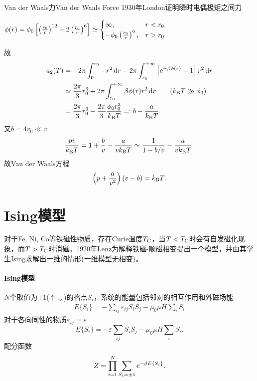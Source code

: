 \begin{example}{Van der Waals力}{Van der Waals Force}
	1930年London证明瞬时电偶极矩之间力
	\begin{center}
		\(\phi(r)=\phi_0\left[\left(\frac{r_0}r\right)^{12}-2\left(\frac{r_0}r\right)^6\right]\simeq\begin{cases}
			\infty,&r<r_0\\
			-\phi_0\left(\frac{r_0}r\right)^6,&r>r_0
		\end{cases}\)

	\end{center}
	故
	{\begin{align*}
		a_2(T)&=-2\pi\int_0^{r_0}-r^2\d r-2\pi\int_{r_0}^{+\infty}\fkh{\e{-\beta\phi(r)}-1}r^2\d r\\
		&\simeq\frac{2\pi}3r_0^3+2\pi\int_{r_0}^{+\infty}\beta\phi(r)r^2\d r\tag{$\kB T\gg\phi_0$}\\
		&=\frac{2\pi}3r_0^3-\frac{2\pi}3\frac{\phi_0r_0^3}{\kB T}=:b-\frac a{\kB T}.
	\end{align*}}
	又$b=4v_0\ll v$
	\[
		\frac{pv}{k_{\mathrm B} T}=1+\frac bv-\frac a{vk_{\mathrm B} T}\simeq\frac1{1-b/v}-\frac a{vk_{\mathrm B} T}.
	\]
	故Van der Waals方程
	\begin{align}
		\left(p+\frac a{v^2}\right)(v-b)=k_{\mathrm B} T.
	\end{align}
\end{example}
\section{Ising模型}
对于Fe, Ni, Co等铁磁性物质，存在Curie温度$T_\mathrm C$，当$T<T_\mathrm C$时会有自发磁化现象，而$T>T_\mathrm C$时消磁。1920年Lenz为解释铁磁-顺磁相变提出一个模型，并由其学生Ising求解出一维的情形(一维模型无相变)。

\paragraph{Ising模型}$N$个取值为$\pm 1$($\uparrow\downarrow$)的格点$S_i$，系统的能量包括邻对的相互作用和外磁场能
\begin{align}
	E\{S_i\}=-\sum_{ij}\varepsilon_{ij}S_iS_j-\mu_0\mu H\sum_iS_i
\end{align}
对于各向同性的物质$\varepsilon_{ij}=\varepsilon$
\[
	E\{S_i\}=-\varepsilon\sum_{ij}S_iS_j-\mu_0\mu H\sum_iS_i.
\]
配分函数
\[
	Z=\prod_{i=1}^N\sum_{S_i=\pm 1}\mathop{}\!\mathrm{e}^{-\beta E\{S_i\}}.\]
